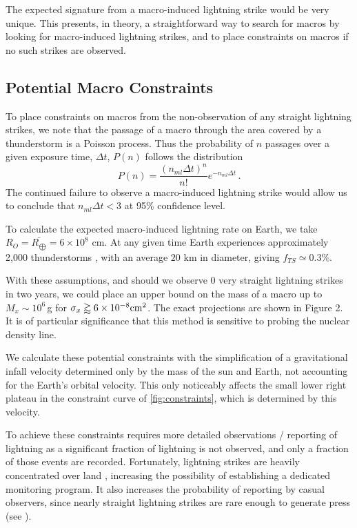 \documentclass[%
 reprint,
 amsmath,amssymb,
 aps,
]{revtex4-2}
\begin{document}
        The expected signature from a macro-induced lightning strike would be very unique. This presents, in theory, a straightforward way to search for macros by looking for macro-induced lightning strikes, and to place constraints on macros if no such strikes are observed. 


    \subsection{Potential Macro Constraints} %
    \label{sub:macro_constraints_on_earth}

        To place constraints on macros from the non-observation of any straight lightning strikes, we note that the passage of a macro through the area covered by a thunderstorm is a Poisson process. Thus the probability of $n$ passages over a given exposure time, $\Delta t$, $P(n)$ follows the distribution
        \begin{equation}\label{eq:poisson}
            P(n) = \frac{\left({n_{ml} \Delta t}\right)^n}{n!} e^{-n_{ml} \Delta t}\,.
        \end{equation}
        The continued failure to observe a macro-induced lightning strike would allow us to conclude that $n_{ml}\Delta t<3$ at 95$\%$ confidence level.

        To calculate the expected macro-induced lightning rate on Earth,  we take $R_{O} = \bar{R_{\bigoplus}} = 6 \times 10^8$ cm.  At any given time Earth experiences approximately 2,000 thunderstorms \citep{NatGeo}, with an average $20$ km in diameter, giving $f_{TS}\simeq 0.3\%$.

        With these assumptions, and should we observe 0 very straight lightning strikes in two years, we could place an upper bound on the mass of a macro up to $M_x \sim 10^6\,$g for $\sigma_x\gtrapprox6\times10^{-8}{\rm cm}^2$. The exact projections are shown in Figure 2. It is of particular significance that this method is sensitive to probing the nuclear density line.
        
        We calculate these potential constraints with the simplification of a gravitational infall velocity determined only by the mass of the sun and Earth, not accounting for the Earth's orbital velocity. This only noticeably affects the small lower right plateau in the constraint curve of \ref{fig:constraints}, which is determined by this velocity.

        To achieve these constraints requires more detailed observations / reporting of lightning as a significant fraction of lightning is not observed, and only a fraction of those events are recorded. Fortunately, lightning strikes are heavily concentrated over land \citep{Christian2003},  increasing the possibility of establishing a dedicated monitoring program.  It also increases the probability of reporting by casual observers, since nearly straight lightning strikes are rare enough to generate press (see \citet{Zimbabwe}).
\end{document}
